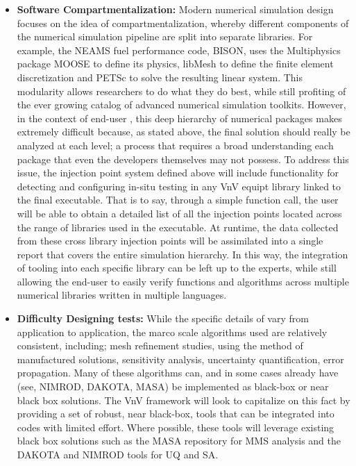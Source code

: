 \begin{itemize}
 \item {\bf Software Compartmentalization:} Modern numerical simulation design focuses on the idea of compartmentalization, whereby different components of the numerical simulation pipeline are split into separate libraries. For example, the NEAMS fuel performance code, BISON, uses the Multiphysics package MOOSE to define its physics, libMesh to define the finite element discretization and PETSc to solve the resulting linear system. This modularity allows researchers to do what they do best, while still profiting of the ever growing catalog of advanced numerical simulation toolkits. However, in the context of end-user \VV, this deep hierarchy of numerical packages makes \VV extremely difficult because, as stated above, the final solution should really be analyzed at each level; a process that requires a broad understanding each package that even the developers themselves may not possess. To address this issue, the injection point system defined above will include functionality for detecting and configuring in-situ \VV testing in any VnV equipt library linked to the final executable. That is to say, through a simple function call, the user will be able to obtain a  detailed list of all the injection points located across the range of libraries used in the executable. At runtime, the data collected from these cross library injection points will be assimilated into a single \VV report that covers the entire simulation hierarchy. In this way, the integration of \VV tooling into each specific library can be left up to the experts, while still allowing the end-user to easily verify functions and algorithms across multiple numerical libraries written in multiple languages. 
 \item {\bf Difficulty Designing \VV tests:} While the specific details of \VV vary from application to application, the marco scale algorithms used are relatively consistent, including;
 mesh refinement studies, using the method of manufactured solutions, sensitivity analysis, uncertainty quantification, error propagation. Many of these algorithms can, and in some 
 cases already have (see, NIMROD, DAKOTA, MASA) be implemented as black-box or near black box solutions. The VnV framework will look to capitalize on this fact by providing a set of robust,
 near black-box, \VV tools that can be integrated into codes with limited effort. Where possible, these tools will leverage existing black box solutions such as the MASA repository for MMS 
 analysis and the DAKOTA and NIMROD tools for UQ and SA. 

\end{itemize}
